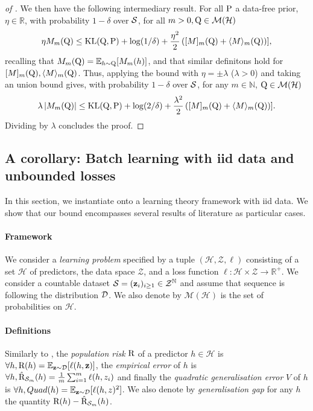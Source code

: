 \begin{proof}[of ]
We then have the following intermediary result. For all $\P$ a data-free prior, $\eta\in\mathbb{R}$, with probability $1-\delta$ over $\S$, for all $m>0, \Q\in\mathcal{M}(\mathcal{H})$
\begin{align}
\label{eq: intermediary_result_main}
\eta M_m(\Q)  \leq  \operatorname{KL}(\Q,\P) +\log(1/\delta) + \frac{\eta^2}{2}\left( [M]_m(\Q) + \langle M \rangle_m(\Q)  \right) ],
\end{align}
recalling that $M_m(\Q)= \mathbb{E}_{h\sim \Q}[M_m(h)]$, and that similar definitons hold for $[M]_m(\Q), \langle M \rangle_m(\Q)$.
Thus, applying the bound with $\eta= \pm\lambda$ ($\lambda>0$) and taking an union bound gives, with probability $1-\delta$ over $\S$, for any $m\in\mathbb{N}$, $\Q\in\mathcal{M}(\mathcal{H})$
\[ \lambda\left|M_m(\Q)\right| \leq  \operatorname{KL}(\Q,\P) + \log(2/\delta) + \frac{\lambda^2}{2}\left( [M]_m(\Q) + \langle M \rangle_m(\Q)  \right) ].  \]
Dividing by $\lambda$ concludes the proof.
\end{proof}


\subsection{A corollary: Batch learning with iid data and unbounded losses}
\label{sec: iid_case}

In this section, we instantiate  onto a learning theory framework with iid data. We show that our bound encompasses several results of literature as particular cases.
\paragraph{Framework} We consider a \emph{learning problem} specified by a tuple $(\mathcal{H}, \mathcal{Z}, \ell)$ consisting of a set $\mathcal{H}$ of predictors, the data space $\mathcal{Z}$, and a loss function $\ell : \mathcal{H}\times \mathcal{Z} \rightarrow \mathbb{R}^{+} $.
We consider a countable dataset $\S=(\z_i)_{i\geq 1}\in\mathcal{Z}^{\mathbb{N}}$ and assume that sequence is \iid following the distribution $\D$. We also denote by $\mathcal{M}(\mathcal{H})$ is the set of probabilities on $\mathcal{H}$.
\paragraph{Definitions} Similarly to , the \emph{population risk} $\Risk$ of a predictor $h\in\mathcal{H}$ is $\forall h, \Risk(h)= \mathbb{E}_{\z\sim\D}[\ell(h,\z)]$, the \emph{empirical error} of $h$ is  $\forall h, \Riskhat_{\Sm}(h)= \frac{1}{m}\sum_{i=1}^m\ell(h,z_i)$
and finally the \emph{quadratic generalisation error} $V$ of $h$ is $\forall h, Quad(h)= \mathbb{E}_{\z\sim\D}[\ell(h,z)^2]$.
We also denote by \emph{generalisation gap} for any $h$ the quantity $\Risk(h)-\Riskhat_{\Sm}(h)$.
\medskip

